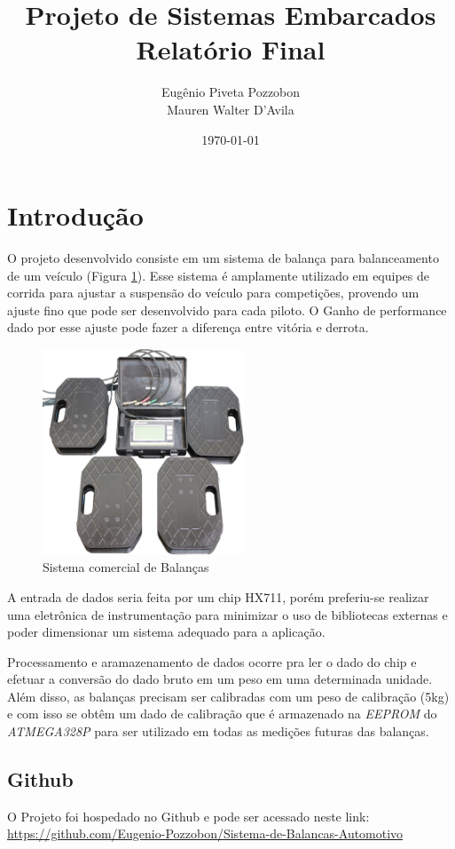 \documentclass[a4paper, 12pt]{article}
\title{Projeto de Sistemas Embarcados\\Relatório Final}
\author{Eugênio Piveta Pozzobon\\Mauren Walter D'Avila}
\date{\today}
\begin{document}
	\maketitle
	\newpage
	\tableofcontents
	\newpage
	
	\section{Introdução}
	
	O projeto desenvolvido consiste em um sistema de balança para balanceamento de um veículo (Figura \ref{fig:cornerweithscaleexample}). Esse sistema é amplamente utilizado em equipes de corrida para ajustar a suspensão do veículo para competições, provendo um ajuste fino que pode ser desenvolvido para cada piloto. O Ganho de performance dado por esse ajuste pode fazer a diferença entre vitória e derrota. 
	
	\begin{figure}[!htb]
	\centering
		\includegraphics[width=6cm]{
			cornerweithscaleexample}
		\caption{Sistema comercial de Balanças}
		\label{fig:cornerweithscaleexample}
	\end{figure}
	
	A entrada de dados seria feita por um chip HX711, porém preferiu-se realizar uma eletrônica de instrumentação para minimizar o uso de bibliotecas externas e poder dimensionar um sistema adequado para a aplicação. 
	
	Processamento e aramazenamento de dados ocorre pra ler o dado do chip e efetuar a conversão do dado bruto em um peso em uma determinada unidade. Além disso, as balanças precisam ser calibradas com um peso de calibração (5kg) e com isso se obtêm um dado de calibração que é armazenado na \textit{EEPROM} do \textit{ATMEGA328P} para ser utilizado em todas as medições futuras das balanças. 
	
	\subsection{Github}
	O Projeto foi hospedado no Github e pode ser acessado neste link: \url{https://github.com/Eugenio-Pozzobon/Sistema-de-Balancas-Automotivo}
	
\end{document}
